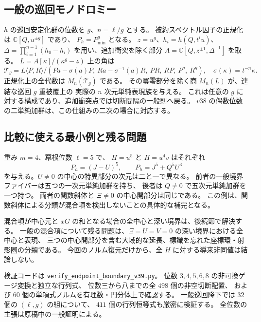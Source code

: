 \subsection{一般の巡回モノドロミー}
$h$ の巡回安定化群の位数を $g$、$n=\ell/g$ とする。
被約スペクトル因子の正規化は $\mathbb C[Q,u^{\pm g}]$ であり、
$P_h=P_{\mathrm{min}}^g$ となる。
$z=u^g$、$h_i=h(Q,t^iu)$、
$\Delta=\prod_{i=1}^{n-1}(h_0-h_i)$ を用い、追加衝突を除く部分
$A=\mathbb C[Q,z^{\pm1},\Delta^{-1}]$ を取る。
$L=A[\kappa]/(\kappa^g-z)$ 上の角は
\[
 \mathcal T_g=
 L\langle P,R\rangle/
 (Pa-\sigma(a)P,\ Ra-\sigma^{-1}(a)R,\ PR,\ RP,\ P^g,\ R^g),
 \quad \sigma(\kappa)=t^{-n}\kappa.
\]
正規化上の全代数は $M_n(\mathcal T_g)$ である。
その冪零部分を除く商 $M_n(L)$ が、連結な巡回 $g$ 重被覆上の
実際の $n$ 次元単純表現族を与える。
これは任意の $g$ に対する構成であり、追加衝突点では切断間隔の一般則へ戻る。
$v38$ の偶数位数の二単純加群は、この仕組みの二次の場合に対応する。

\subsection{比較に使える最小例と残る問題}
重み $m=4$、冪根位数 $\ell=5$ で、
$H=u^5$ と $H=u^4v$ はそれぞれ
\[
 P_h=(J-U)^5,\qquad P_h=J^5+Q^5U^3
\]
を与える。$U\ne0$ の中心の特異部分の次元は二と一で異なる。
前者の一般境界ファイバーは五つの一次元単純加群を持ち、
後者は $Q\ne0$ で五次元単純加群を一つ持つ。
両者の関数斜体と $\Xi\ne0$ の中心開部分は同じである。
この例は、関数斜体による分類が混合項を検出しないことの具体的な補完となる。

混合項が中心元と $xG$ の和となる場合の全中心と深い境界は、後続節で解決する。
一般の混合項について残る問題は、$\Xi=U=V=0$ の深い境界における全中心と表現、
三つの中心開部分を含む大域的な延長、標識を忘れた座標環・射影圏の分類である。
今回のノルム復元だけから、全 $H$ に対する導来非同値は結論しない。

検証コードは \texttt{verify\_endpoint\_boundary\_v39.py}。
位数 $3,4,5,6,8$ の非可換ゲージ変換と独立な行列式、
位数三から八までの全 $498$ 個の非空切断配置、
および $60$ 個の単項式ノルムを有理数・円分体上で確認する。
一般巡回降下では $32$ 個の $(\ell,g)$ の組について、
$411$ 個の行列恒等式も厳密に検証する。
全位数の主張は原稿中の一般証明による。
